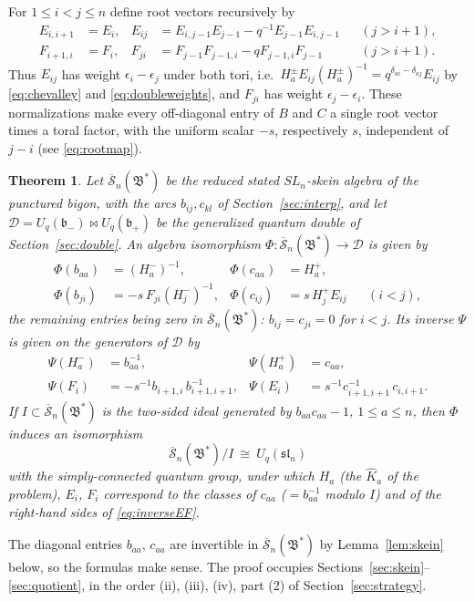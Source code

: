 \documentclass[12pt]{article}
\newtheorem{theorem}{Theorem}[section]
\theoremstyle{remark}
\newcommand{\U}{U_q}
\newcommand{\slN}{\mathfrak{sl}_n}
\newcommand{\bp}{\mathfrak b_+}
\newcommand{\bm}{\mathfrak b_-}
\newcommand{\redS}{\overline{\mathcal S}_n}
\newcommand{\Bstar}{\mathfrak B^*}
\newcommand{\cD}{\mathcal D}
\begin{document}
For $1\le i<j\le n$ define root vectors recursively by
\begin{align}
 E_{i,i+1}&=E_i,&
 E_{ij}&=E_{i,j-1}E_{j-1}-q^{-1}E_{j-1}E_{i,j-1}
                  &&(j>i+1), \label{eq:Eroots}\\
 F_{i+1,i}&=F_i,&
 F_{ji}&=F_{j-1}F_{j-1,i}-qF_{j-1,i}F_{j-1}
                  &&(j>i+1). \label{eq:Froots}
\end{align}
Thus $E_{ij}$ has weight $\epsilon_i-\epsilon_j$ under both tori, i.e.\
$H^\pm_aE_{ij}(H^\pm_a)^{-1}=q^{\delta_{ai}-\delta_{aj}}E_{ij}$ by
\eqref{eq:chevalley} and \eqref{eq:doubleweights}, and $F_{ji}$ has
weight $\epsilon_j-\epsilon_i$. These normalizations make every
off-diagonal entry of $B$ and $C$ a single root vector times a toral
factor, with the uniform scalar $-s$, respectively $s$, independent of
$j-i$ (see \eqref{eq:rootmap}).

\begin{theorem}\label{thm:main}
Let $\redS(\Bstar)$ be the reduced stated $SL_n$-skein algebra of the
punctured bigon, with the arcs $b_{ij},c_{kl}$ of
Section~\ref{sec:interp}, and let $\cD=\U(\bm)\bowtie\U(\bp)$ be the
generalized quantum double of Section~\ref{sec:double}. An algebra
isomorphism $\Phi:\redS(\Bstar)\to\cD$ is given by
\begin{align}
 \Phi(b_{aa})&=(H^-_a)^{-1},&
 \Phi(c_{aa})&=H^+_a, \label{eq:diagonalmap}\\
 \Phi(b_{ji})&=-s\,F_{ji}(H^-_j)^{-1},&
 \Phi(c_{ij})&=s\,H^+_jE_{ij}
                       &&(i<j), \label{eq:rootmap}
\end{align}
the remaining entries being zero in $\redS(\Bstar)$: $b_{ij}=c_{ji}=0$
for $i<j$. Its inverse $\Psi$ is given on the generators of $\cD$ by
\begin{align}
 \Psi(H^-_a)&=b_{aa}^{-1},&
 \Psi(H^+_a)&=c_{aa}, \label{eq:inverseH}\\
 \Psi(F_i)&=-s^{-1}b_{i+1,i}\,b_{i+1,i+1}^{-1},&
 \Psi(E_i)&=s^{-1}c_{i+1,i+1}^{-1}\,c_{i,i+1}. \label{eq:inverseEF}
\end{align}
If $I\subset\redS(\Bstar)$ is the two-sided ideal generated by
$b_{aa}c_{aa}-1$, $1\le a\le n$, then $\Phi$ induces an isomorphism
\[
 \redS(\Bstar)/I\ \cong\ \U(\slN)
\]
with the simply-connected quantum group, under which $H_a$ (the
$\hat K_a$ of the problem), $E_i$, $F_i$ correspond to the classes of
$c_{aa}$ ($=b_{aa}^{-1}$ modulo $I$) and of the right-hand sides of
\eqref{eq:inverseEF}.
\end{theorem}

The diagonal entries $b_{aa}$, $c_{aa}$ are invertible in
$\redS(\Bstar)$ by Lemma~\ref{lem:skein} below, so the formulas make
sense.
The proof occupies Sections~\ref{sec:skein}--\ref{sec:quotient}, in the
order (ii), (iii), (iv), part (2) of Section~\ref{sec:strategy}.
\end{document}
